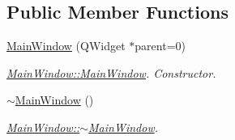 \subsection*{Public Member Functions}
\begin{DoxyCompactItemize}
\item 
\hyperlink{class_main_window_a8b244be8b7b7db1b08de2a2acb9409db}{Main\-Window} (Q\-Widget $\ast$parent=0)
\begin{DoxyCompactList}\small\item\em \hyperlink{class_main_window_a8b244be8b7b7db1b08de2a2acb9409db}{Main\-Window\-::\-Main\-Window}. Constructor. \end{DoxyCompactList}\item 
\hyperlink{class_main_window_ae98d00a93bc118200eeef9f9bba1dba7}{$\sim$\-Main\-Window} ()
\begin{DoxyCompactList}\small\item\em \hyperlink{class_main_window_ae98d00a93bc118200eeef9f9bba1dba7}{Main\-Window\-::$\sim$\-Main\-Window}. \end{DoxyCompactList}\end{DoxyCompactItemize}
